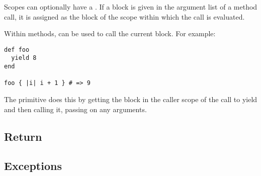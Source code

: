 Scopes can optionally have a . If a block is given in the argument list of a method call, it is assigned as the block of the scope within which the call is evaluated.

Within methods,  can be used to call the current block. For example:

\begin{lstlisting}
def foo
  yield 8
end

foo { |i| i + 1 } # => 9
\end{lstlisting}

The  primitive does this by getting the block in the caller scope of the call to yield and then calling it, passing on any arguments.

\subsection{Return}

\subsection{Exceptions}
